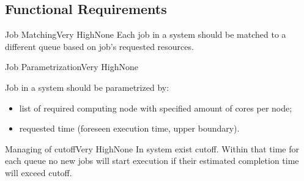 \subsection*{Functional Requirements}
	\begin{comment}
		$<$Itemize the detailed functional requirements associated with this feature.  
		These are the software capabilities that must be present in order for the user 
		to carry out the services provided by the feature, or to execute the use case.  
		Include how the product should respond to anticipated error conditions or 
		invalid inputs. Requirements should be concise, complete, unambiguous, 
		verifiable, and necessary. Use “TBD” as a placeholder to indicate when necessary 
		information is not yet available.$>$
		
		$<$Each requirement should be uniquely identified with a sequence number or a 
		meaningful tag of some kind.$>$
		
		REQ-1:	REQ-2:
	\end{comment}
	
	\begin{functional}{Job Matching}{Very High}{None}
		\label{fn:simulation-feature:job-matcher}
		{
			Each job in a system should be matched to a different queue based on job's requested resources.
		}
	\end{functional}

	\begin{functional}{Job Parametrization}{Very High}{None}
		\label{fn:simulation-feature:job-parametrization}
		{
			Job in a system should be parametrized by:
			\begin{itemize}
				\item list of required \gls{computing node} with specified amount of cores per node;
				\item requested time (foreseen execution time, upper boundary).
			\end{itemize}
		}
	\end{functional}

	\begin{functional}{Managing of \gls{cutoff}}{Very High}{None}
		\label{fn:simulation-feature:cutoff}
		{
			In system exist \gls{cutoff}. Within that time for each queue no new jobs will start execution if their estimated completion time will exceed \gls{cutoff}.
		}
	\end{functional}

